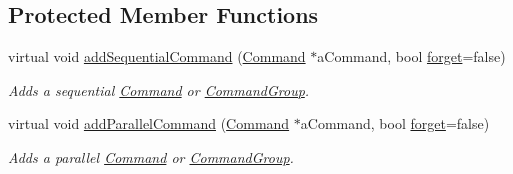 \subsection*{Protected Member Functions}
\begin{DoxyCompactItemize}
\item 
virtual void \mbox{\hyperlink{classlib_iterative_robot_1_1_command_group_a7e3167a89a45e6b1fc5df9a18c2946b7}{add\+Sequential\+Command}} (\mbox{\hyperlink{classlib_iterative_robot_1_1_command}{Command}} $\ast$a\+Command, bool \mbox{\hyperlink{classlib_iterative_robot_1_1_command_group_ae6779a068983b84e265c0ff4fc74488d}{forget}}=false)
\begin{DoxyCompactList}\small\item\em Adds a sequential \mbox{\hyperlink{classlib_iterative_robot_1_1_command}{Command}} or \mbox{\hyperlink{classlib_iterative_robot_1_1_command_group}{Command\+Group}}. \end{DoxyCompactList}\item 
virtual void \mbox{\hyperlink{classlib_iterative_robot_1_1_command_group_a7255a0b640e74ce74870939b45d23a58}{add\+Parallel\+Command}} (\mbox{\hyperlink{classlib_iterative_robot_1_1_command}{Command}} $\ast$a\+Command, bool \mbox{\hyperlink{classlib_iterative_robot_1_1_command_group_ae6779a068983b84e265c0ff4fc74488d}{forget}}=false)
\begin{DoxyCompactList}\small\item\em Adds a parallel \mbox{\hyperlink{classlib_iterative_robot_1_1_command}{Command}} or \mbox{\hyperlink{classlib_iterative_robot_1_1_command_group}{Command\+Group}}. \end{DoxyCompactList}\end{DoxyCompactItemize}
